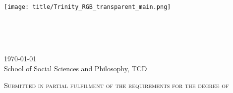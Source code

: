 \begin{titlepage}

    \center %
    
    
    
    \texttt{[image: title/Trinity\_RGB\_transparent\_main.png]}\\[1cm] 
    \ifdefined\school
    \Large \textsc{\school} \\[1.5cm] %
    \ifdefined\department
    \large \department\\[1.5cm] %
    \fi
    
    \makeatletter
    \textsc{{\huge \bfseries \thesistitle}}\\[1.5cm] %
     
    
   
    \authorname
    \par
    \authorid
    
    
    \textsc{{\large \today}}\\[2cm] %
    
    {School of Social Sciences and Philosophy, TCD}
    \vfill
    
    \textsc{\normalsize Submitted in partial fulfilment of the requirements for the degree of \\
    \degree}
    
    \vfill %
    
\end{titlepage}
